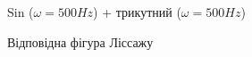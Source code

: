 \begin{figure}[h]
\begin{minipage}[h]{0.47\linewidth}
	\end{minipage}
	\vfill
	\begin{minipage}[h]{0.47\linewidth}
		 Sin ($\omega=500 Hz$) + трикутний ($\omega=500 Hz$) \\
	\end{minipage}
	\hfill
	\begin{minipage}[h]{0.47\linewidth}
		 Відповідна фігура Ліссажу \\

\end{minipage}
\end{figure}
